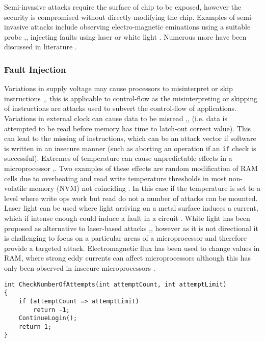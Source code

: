 Semi-invasive attacks  require the surface of chip to be exposed, however the security is compromised without directly modifying the chip. Examples of semi-invasive attacks include observing electro-magnetic eminations using a suitable probe \cite{Gandolfi2007},\cite{Quisquater2001}, injecting faults using laser \cite{Bar-el2006} or white light \cite{Skorobogatov2007}. Numerous more have been discussed in literature \cite{Skorobogatov2005}.

\subsubsection{Fault Injection}

Variations in supply voltage may cause processors to misinterpret or skip instructions \cite{Anderson1996},\cite{Blomer2010}, this is applicable to control-flow as the misinterpreting or skipping of instructions are attacks used to subvert the control-flow of applications.
Variations in external clock can cause data to be misread \cite{Anderson1996},\cite{Street},\cite{Kommerling1999} (i.e. data is attempted to be read before memory has time to latch-out correct value). This can lead to the missing of instructions, which can be an attack vector if software is written in an insecure manner (such as aborting an operation if an \verb|if| check is successful).
Extremes of temperature can cause unpredictable effects in a microprocessor \cite{Boneh},\cite{Govindavajhala2003}. Two examples of these effects are random modification of RAM cells due to overheating and read write temperature thresholds in most non-volatile memory (NVM) not coinciding \cite{Bar-el2006}. In this case if the temperature is set to a level where write ops work but read do not a number of attacks can be mounted. Laser light can be used where light arriving on a metal surface induces a current, which if intense enough could induce a fault in a circuit \cite{Habing1965}. White light has been proposed as alternative to laser-based attacks \cite{Anderson1996},\cite{Skorobogatov2007}, however as it is not directional it is challenging to focus on a particular areas of a microprocessor and therefore provide a targeted attack. Electromagnetic flux has been used to change values in RAM, where strong eddy currents can affect microprocessors although this has only been observed in insecure microprocessors \cite{Samyde2003}.

\begin{lstlisting}[language={[Sharp]C},caption={An example of code which is vulnerable to skipping of instructions},label={lst:instructionSkip}]
int CheckNumberOfAttempts(int attemptCount, int attemptLimit)
{
    if (attemptCount => attemptLimit)
        return -1;
    ContinueLogin();
    return 1;
}
\end{lstlisting}

